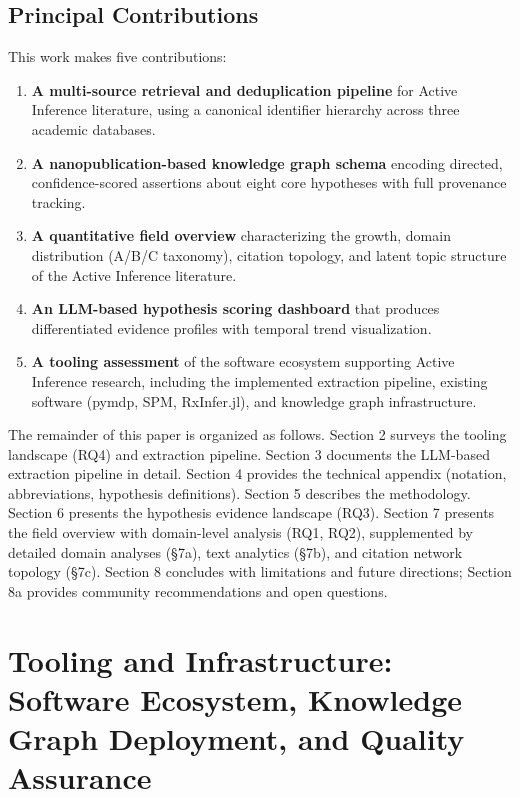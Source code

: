 \documentclass[
]{article}
\begin{document}
\subsection{Principal Contributions}\label{principal-contributions}

This work makes five contributions:

\begin{enumerate}
\def\labelenumi{\arabic{enumi}.}
\item
  \textbf{A multi-source retrieval and deduplication pipeline} for
  Active Inference literature, using a canonical identifier hierarchy
  across three academic databases.
\item
  \textbf{A nanopublication-based knowledge graph schema} encoding
  directed, confidence-scored assertions about eight core hypotheses
  with full provenance tracking.
\item
  \textbf{A quantitative field overview} characterizing the growth,
  domain distribution (A/B/C taxonomy), citation topology, and latent
  topic structure of the Active Inference literature.
\item
  \textbf{An LLM-based hypothesis scoring dashboard} that produces
  differentiated evidence profiles with temporal trend visualization.
\item
  \textbf{A tooling assessment} of the software ecosystem supporting
  Active Inference research, including the implemented extraction
  pipeline, existing software (pymdp, SPM, RxInfer.jl), and knowledge
  graph infrastructure.
\end{enumerate}

The remainder of this paper is organized as follows. Section 2 surveys
the tooling landscape (RQ4) and extraction pipeline. Section 3 documents
the LLM-based extraction pipeline in detail. Section 4 provides the
technical appendix (notation, abbreviations, hypothesis definitions).
Section 5 describes the methodology. Section 6 presents the hypothesis
evidence landscape (RQ3). Section 7 presents the field overview with
domain-level analysis (RQ1, RQ2), supplemented by detailed domain
analyses (§7a), text analytics (§7b), and citation network topology
(§7c). Section 8 concludes with limitations and future directions;
Section 8a provides community recommendations and open questions.

\newpage

\section{\texorpdfstring{Tooling and Infrastructure: Software Ecosystem,
Knowledge Graph Deployment, and Quality Assurance
\label{sec:tooling}}{Tooling and Infrastructure: Software Ecosystem, Knowledge Graph Deployment, and Quality Assurance }}\label{tooling-and-infrastructure-software-ecosystem-knowledge-graph-deployment-and-quality-assurance}
\end{document}

